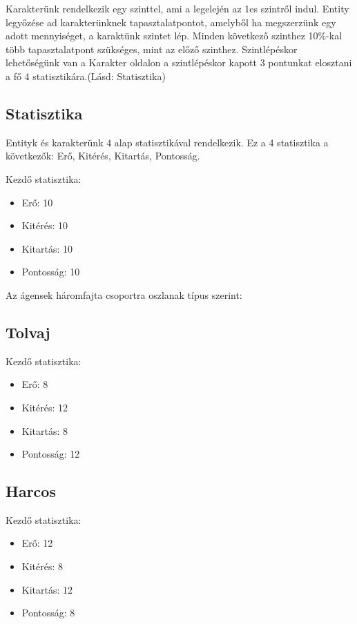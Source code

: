 Karakterünk rendelkezik egy szinttel, ami a legelején az 1es szintről indul.
Entity legyőzése ad karakterünknek tapasztalatpontot, amelyből ha megszerzünk egy adott mennyiséget, a karaktünk szintet lép.
Minden következő szinthez 10\%-kal több tapasztalatpont szükséges, mint az előző szinthez.
Szintlépéskor lehetőségünk van a Karakter oldalon a szintlépéskor kapott 3 pontunkat elosztani a fő 4 statisztikára.(Lásd: Statisztika)

\subsection{Statisztika}

Entityk és karakterünk 4 alap statisztikával rendelkezik.
Ez a 4 statisztika a következők: Erő, Kitérés, Kitartás, Pontosság.

Kezdő statisztika:
\begin{itemize}
    \item Erő: 10
    \item Kitérés: 10
    \item Kitartás: 10
    \item Pontosság: 10
\end{itemize}


Az ágensek háromfajta csoportra oszlanak típus szerint:

\subsection{Tolvaj}

Kezdő statisztika:
\begin{itemize}
    \item Erő: 8
    \item Kitérés: 12
    \item Kitartás: 8
    \item Pontosság: 12
\end{itemize}

\subsection{Harcos}

Kezdő statisztika:
\begin{itemize}
    \item Erő: 12
    \item Kitérés: 8
    \item Kitartás: 12
    \item Pontosság: 8
\end{itemize}

